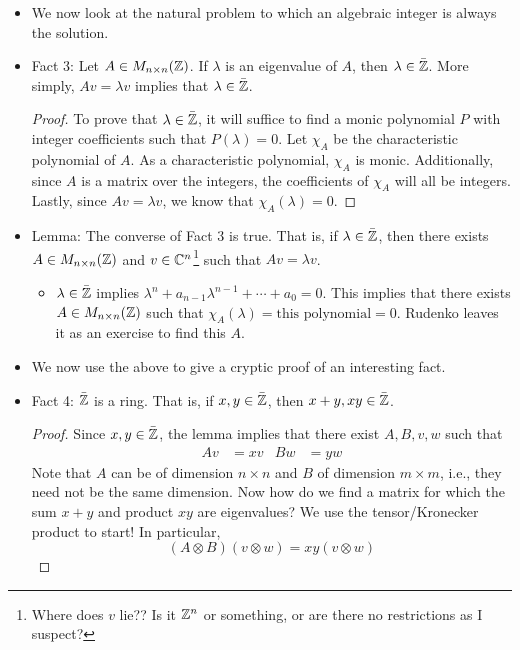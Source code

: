 \documentclass[../notes.tex]{subfiles}
\begin{document}
\begin{itemize}
    \item We now look at the natural problem to which an algebraic integer is always the solution.
    \item Fact 3: Let $A\in M_{n\times n}(\mathbb{Z})$. If $\lambda$ is an eigenvalue of $A$, then $\lambda\in\bar{\mathbb{Z}}$. More simply, $Av=\lambda v$ implies that $\lambda\in\bar{\mathbb{Z}}$.
    \begin{proof}
        To prove that $\lambda\in\bar{\mathbb{Z}}$, it will suffice to find a monic polynomial $P$ with integer coefficients such that $P(\lambda)=0$. Let $\chi_A$ be the characteristic polynomial of $A$. As a characteristic polynomial, $\chi_A$ is monic. Additionally, since $A$ is a matrix over the integers, the coefficients of $\chi_A$ will all be integers. Lastly, since $Av=\lambda v$, we know that $\chi_A(\lambda)=0$.
    \end{proof}
    \item Lemma: The converse of Fact 3 is true. That is, if $\lambda\in\bar{\mathbb{Z}}$, then there exists $A\in M_{n\times n}(\mathbb{Z})$ and $v\in\mathbb{C}^n$\footnote{Where does $v$ lie?? Is it $\mathbb{Z}^n$ or something, or are there no restrictions as I suspect?} such that $Av=\lambda v$.
    \begin{itemize}
        \item $\lambda\in\bar{\mathbb{Z}}$ implies $\lambda^n+a_{n-1}\lambda^{n-1}+\cdots+a_0=0$. This implies that there exists $A\in M_{n\times n}(\mathbb{Z})$ such that $\chi_A(\lambda)=\text{this polynomial}=0$. Rudenko leaves it as an exercise to find this $A$.
    \end{itemize}
    \item We now use the above to give a cryptic proof of an interesting fact.
    \item Fact 4: $\bar{\mathbb{Z}}$ is a ring. That is, if $x,y\in\bar{\mathbb{Z}}$, then $x+y,xy\in\bar{\mathbb{Z}}$.
    \begin{proof}
        Since $x,y\in\bar{\mathbb{Z}}$, the lemma implies that there exist $A,B,v,w$ such that
        \begin{align*}
            Av &= xv&
            Bw &= yw
        \end{align*}
        Note that $A$ can be of dimension $n\times n$ and $B$ of dimension $m\times m$, i.e., they need not be the same dimension. Now how do we find a matrix for which the sum $x+y$ and product $xy$ are eigenvalues? We use the tensor/Kronecker product to start! In particular,
        \begin{equation*}
            (A\otimes B)(v\otimes w) = xy(v\otimes w)
        \end{equation*}

\end{proof}
\end{itemize}
\end{document}
